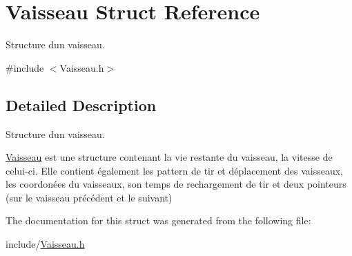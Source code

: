\hypertarget{struct_vaisseau}{}\section{Vaisseau Struct Reference}
\label{struct_vaisseau}


Structure d\textquotesingle{}un vaisseau.  




{\ttfamily \#include $<$Vaisseau.\+h$>$}



\subsection{Detailed Description}
Structure d\textquotesingle{}un vaisseau. 

\hyperlink{struct_vaisseau}{Vaisseau} est une structure contenant la vie restante du vaisseau, la vitesse de celui-\/ci. Elle contient également les pattern de tir et déplacement des vaisseaux, les coordonées du vaisseaux, son temps de rechargement de tir et deux pointeurs (sur le vaisseau précédent et le suivant) 

The documentation for this struct was generated from the following file\+:\begin{DoxyCompactItemize}
\item 
include/\hyperlink{_vaisseau_8h}{Vaisseau.\+h}\end{DoxyCompactItemize}
